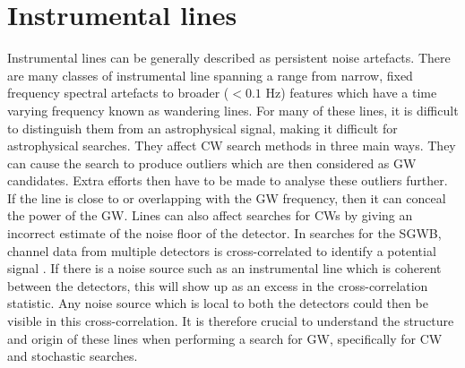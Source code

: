 \section{\label{detchar:lines}Instrumental lines}

%

Instrumental lines can be generally described as persistent noise
artefacts.  There are many classes of
instrumental line spanning a range from narrow, fixed frequency spectral
artefacts to broader ($<0.1$ Hz) features which have a time varying frequency
known as wandering lines.  For many of these lines, it is difficult to
distinguish them from an astrophysical signal, making it difficult for astrophysical searches. 
They affect \gls{CW} search methods in three main ways.  They can cause the search to produce outliers which are then
considered as \gls{GW} candidates.  Extra efforts then have to be made to
analyse these outliers further.  If the line is close to or overlapping with the \gls{GW}
frequency, then it can conceal the power of the \gls{GW}. 
Lines can also affect searches for \glspl{CW} by giving an incorrect estimate of the noise floor of the detector.
In searches for the \gls{SGWB}, channel data from multiple detectors is cross-correlated to identify a potential signal \citep{allen1999DetectingStochastic}.
If there is a noise source such as an instrumental line which is coherent between the detectors, this will show up as an excess in the cross-correlation statistic\citep{covas2018IdentificationMitigation}.
Any noise source which is local to both the detectors could then be visible in this cross-correlation.
It is therefore crucial to understand the structure and origin of these lines when performing a search for
\gls{GW}, specifically for \gls{CW} and stochastic searches.

%

